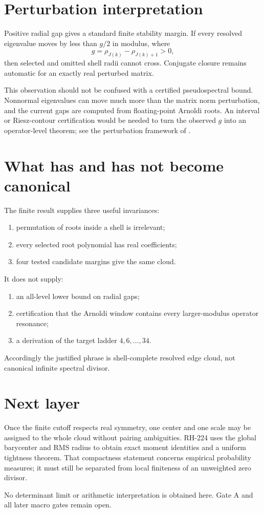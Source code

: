 \documentclass[11pt]{article}
\theoremstyle{remark}\newtheorem{remark}[theorem]{Remark}
\begin{document}
\section{Perturbation interpretation}

Positive radial gap gives a standard finite stability margin. If every
resolved eigenvalue moves by less than $g/2$ in modulus, where
\[
 g=\rho_{J(k)}-\rho_{J(k)+1}>0,
\]
then selected and omitted shell radii cannot cross. Conjugate closure remains
automatic for an exactly real perturbed matrix.

This observation should not be confused with a certified pseudospectral
bound. Nonnormal eigenvalues can move much more than the matrix norm
perturbation, and the current gaps are computed from floating-point Arnoldi
roots. An interval or Riesz-contour certification would be needed to turn
the observed $g$ into an operator-level theorem; see the perturbation
framework of \citet{Kato1995}.

\section{What has and has not become canonical}

The finite result supplies three useful invariances:
\begin{enumerate}[leftmargin=2em]
\item permutation of roots inside a shell is irrelevant;
\item every selected root polynomial has real coefficients;
\item four tested candidate margins give the same cloud.
\end{enumerate}
It does not supply:
\begin{enumerate}[leftmargin=2em]
\item an all-level lower bound on radial gaps;
\item certification that the Arnoldi window contains every larger-modulus
operator resonance;
\item a derivation of the target ladder $4,6,\ldots,34$.
\end{enumerate}

Accordingly the justified phrase is shell-complete resolved edge cloud, not
canonical infinite spectral divisor.

\section{Next layer}

Once the finite cutoff respects real symmetry, one center and one scale may be
assigned to the whole cloud without pairing ambiguities. RH-224 uses the
global barycenter and RMS radius to obtain exact moment identities and a
uniform tightness theorem. That compactness statement concerns empirical
probability measures; it must still be separated from local finiteness of an
unweighted zero divisor.

No determinant limit or arithmetic interpretation is obtained here. Gate A
and all later macro gates remain open.



\end{document}
